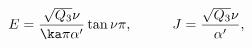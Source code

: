 \begin{equation}
E = \frac{\sqrt{Q_3}\nu}{\ka\pi\alpha'}\tan \nu\pi, \hspace{1cm}
J = \frac{\sqrt{Q_3}\nu}{\alpha'},
\end{equation}

